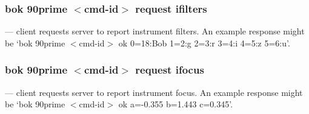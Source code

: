 \documentclass[12pt,twoside]{article}
\begin{document}
\subsubsection{bok 90prime $<$cmd-id$>$ request ifilters}
  --- client requests server to report instrument filters. An example response might be `{\sc bok 90prime $<$cmd-id$>$ ok 0=18:Bob 1=2:g 2=3:r 3=4:i 4=5:z 5=6:u}'.

\subsubsection{bok 90prime $<$cmd-id$>$ request ifocus}
  --- client requests server to report instrument focus. An example response might be `{\sc bok 90prime $<$cmd-id$>$ ok a=-0.355 b=1.443 c=0.345}'.
\end{document}
